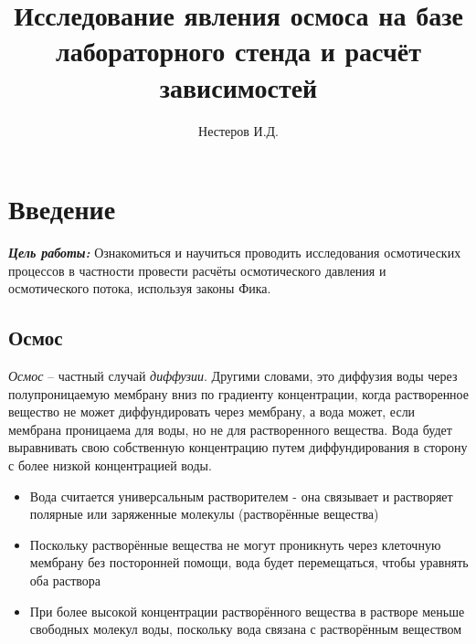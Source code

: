 \documentclass{article}
\title{Исследование явления осмоса на базе лабораторного стенда и расчёт зависимостей}
\author{Нестеров И.Д.}
\date{}
\begin{document}
    \maketitle
    \tableofcontents
    \newpage

    \section*{Введение}

        \hspace*{4mm}\textbf{\textit{Цель работы:}} Ознакомиться и научиться проводить исследования осмотических
        процессов в частности провести расчёты осмотического давления и осмотического потока, используя законы Фика.
        
        \subsection*{Осмос}
            \hspace*{4mm}\textit{Осмос} – частный случай \textit{диффузии}. Другими словами, это диффузия воды
            через полупроницаемую мембрану вниз по градиенту концентрации, когда
            растворенное вещество не может диффундировать через мембрану, а вода может,
            если мембрана проницаема для воды, но не для растворенного
            вещества. Вода будет выравнивать свою собственную концентрацию путем
            диффундирования в сторону с более низкой концентрацией воды.

            \begin{itemize}
                \item Вода считается универсальным растворителем -
                она связывает и растворяет полярные или заряженные
                молекулы (растворённые вещества)

                \item Поскольку растворённые вещества не могут
                проникнуть через клеточную мембрану без посторонней
                помощи, вода будет перемещаться, чтобы уравнять оба
                раствора

                \item При более высокой концентрации растворённого
                вещества в растворе меньше свободных молекул воды,
                поскольку вода связана с растворённым веществом
            \end{itemize}
\end{document}
